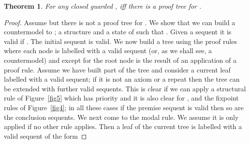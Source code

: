 \documentclass[copyright,creativecommons]{eptcs}
\newtheorem{theorem}[prop]{Theorem}
\begin{document}
\begin{theorem}
For any closed guarded ,  iff there is a proof tree
for  . 
\end{theorem}
\begin{proof}
Assume  but there is not a proof tree for .
We show that we can build a countermodel to ; a structure
 and  a state  of  such that
. 
Given a sequent  it is valid if 
.
The initial sequent  is valid.
We now build a tree using the proof rules where each node
is labelled with a valid sequent (or, as we shall see, a countermodel)
and except for the root node
is the result of an application of a  proof rule.
Assume we have built part of the tree and consider a current leaf
labelled with a valid sequent; if it is not an axiom or a repeat
then the tree can be extended with further valid sequents. This is clear
if we can apply a structural rule of Figure~\ref{fig5} which has priority
and it is also clear for ,  and the fixpoint
rules of Figure~\ref{fig4};
in all these cases if the premise sequent is valid 
then so are the conclusion sequents. 
We next come to the modal rule. We assume it is only applied if no other 
rule applies. Then a leaf of the current tree is labelled with a valid
sequent of the form


\end{proof}
\end{document}

